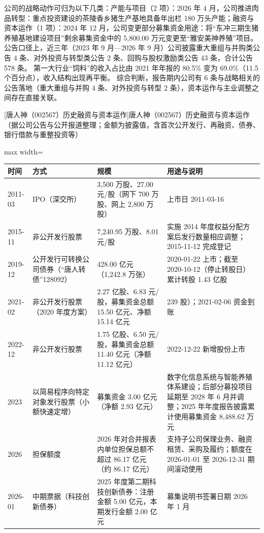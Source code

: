  公司的战略动作可归为以下几类：产能与项目（2 项）：2026 年 4 月，公司推进肉品转型：重点投资建设的茶陵香乡猪生产基地具备年出栏 180 万头产能；融资与资本运作（1 项）：2024 年 12 月，公司变更部分募集资金用途：将“东冲三期生猪养殖基地建设项目”剩余募集资金中的 5,800.00 万元变更至“雅安美神养殖”项目。 公告口径上，近三年（2023 年 9 月---2026 年 9 月）公司披露重大重组与并购类公告 4 条、对外投资与转型类公告 2 条、回购与股权激励类公告 43 条，合计公告 578 条。 第一大行业“饲料”的收入占比由 2021 年年报的 80.5\% 变为 69.0\%（11.5 个百分点），收入结构出现再平衡。 综合判断，报告期内公司有 6 条与战略相关的公告落地（重大重组与并购 4 条、对外投资与转型 2 条），资本运作与主业调整之间存在直接关联。

\begin{center}\small\setlength{\tabcolsep}{4pt}
[唐人神（002567）历史融资与资本运作]{唐人神（002567）历史融资与资本运作（据公司公告与公开报道整理；金额为披露值，含首次公开发行、再融资、债券、银行借款与重整投资等）}
\begin{adjustbox}{max width=\textwidth}
\begin{tabular}{@{}p{1.45cm}p{2.55cm}p{4.05cm}p{4.95cm}@{}}
\toprule
时间 & 方式 & 规模 & 用途与说明 \\
\midrule
2011-03 & IPO（深交所） & 3,\allowbreak{}500 万股、\allowbreak{}27.00 元/\allowbreak{}股（网下 700 万股、\allowbreak{}网上 2,\allowbreak{}800 万股） & 上市日 2011-03-16 \\
2015-11 & 非公开发行股票 & 7,\allowbreak{}240.95 万股、\allowbreak{}8.01 元/\allowbreak{}股 & 实施 2014 年度权益分配方案后发行数量相应调整；2015-11-12 完成登记 \\
2019-12 & 公开发行可转换公司债券（“唐人转债”128092） & 428.00 亿元（1,\allowbreak{}242.8 万张） & 2020-01-22 上市；截至 2020-10-12（停止转股日）累计转股 1.43 亿股 \\
2021-02 & 非公开发行股票（2020 年度方案） & 2.27 亿股、\allowbreak{}6.83 元/\allowbreak{}股，\allowbreak{}募集资金总额 15.50 亿元、\allowbreak{}净额 15.14 亿元 & 239 股）；2021-02-06 资金到账 \\
2022-12 & 非公开发行股票 & 1.75 亿股、\allowbreak{}6.50 元/\allowbreak{}股，\allowbreak{}募集资金总额 11.40 亿元（净额 11.12 亿元） & 2022-12-22 新增股份上市 \\
2023 & 以简易程序向特定对象发行股票（小额快速定增） & 募集资金 3.00 亿元（净额 2.93 亿元） & 数字化信息系统与智能养殖体系建设；后部分募投项目延期至 2028 年 6 月并调整；2025 年年度报告披露累计使用募集资金 8,\allowbreak{}488.62 万元 \\
2026 & 担保额度 & 2026 年对合并报表内单位担保总额不超过 86.17 亿元（约 86.17 亿元） & 支持子公司保理业务、\allowbreak{}融资租赁、\allowbreak{}采购及履约；额度在 2026-01-01 至 2026-12-31 期间滚动使用 \\
2026-01 & 中期票据（科技创新债券） & 2025 年度第二期科技创新债券：注册金额 5.00 亿元，\allowbreak{}本期发行金额 2.00 亿元 & 募集说明书签署日期 2026 年 1 月 \\
\bottomrule
\end{tabular}
\end{adjustbox}
\end{center}

